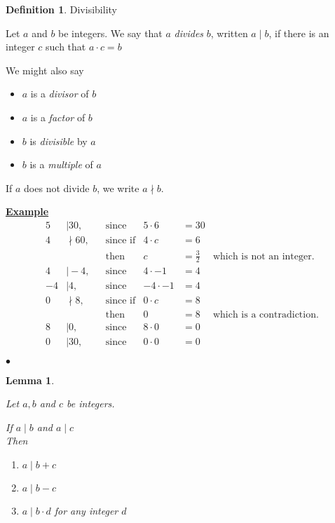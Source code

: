 \documentclass[fleqn,letterpaper,10pt,twoside]{report}
\newcounter{example}
\newenvironment{example}
{\underline{\sffamily\bfseries Example \theexample}\\}
{\hspace*{\fill}$\bullet$ \stepcounter{example}}
\theoremstyle{plain}
\newtheorem{lemma}[theorem]{Lemma}
\theoremstyle{definition}
\newtheorem{definition}{Definition}[section]
\theoremstyle{remark}
\begin{document}
\begin{definition}{Divisibility}

   Let \(a\) and \(b\) be integers. We say that \(a\) \textit{divides}
   \(b\), written \(a \mid b\), if there is an integer \(c\) such that
   \(a \cdot c = b\)

   We might also say
   \begin{itemize}
      \item{\(a\) is a \textit{divisor} of \(b\)}
      \item{\(a\) is a \textit{factor} of \(b\)}
      \item{\(b\) is \textit{divisible} by \(a\)}
      \item{\(b\) is a \textit{multiple} of \(a\)}
   \end{itemize}

   If \(a\) does not divide \(b\), we write \(a \nmid b\).
\end{definition}

\begin{example}
   \begin{align*}
      5&\mid 30, & &\text{since} & 5 \cdot 6 &= 30 \\
      4&\nmid 60,& &\text{since if} & 4 \cdot c &= 6 \\
       &         & &\text{then}  & c &= \frac{3}{2} & \text{which is not an integer.} \\[2ex]
      4&\mid -4, & &\text{since} & 4 \cdot -1 &= 4 \\
      -4&\mid 4, & &\text{since} & -4 \cdot -1 &= 4 \\[2ex]
      0&\nmid 8, & &\text{since if} & 0 \cdot c &= 8 \\
       &         & &\text{then} & 0 &= 8 & \text{which is a contradiction.} \\[2ex]
      8&\mid 0,  & &\text{since} & 8 \cdot 0 &= 0 \\
      0&\mid 30, & &\text{since} & 0 \cdot 0 &= 0
   \end{align*}

\end{example}

\begin{lemma}{\ }

   Let \(a, b\) and \(c\) be integers.

   If \(a \mid b\) and \(a \mid c\) \\
   Then
   \begin{enumerate}
      \item{\(a \mid b + c\)}
      \item{\(a \mid b - c\)}
      \item{\(a \mid b \cdot d\) \qquad for any integer \(d\)}
   \end{enumerate}

\end{lemma}
\end{document}
